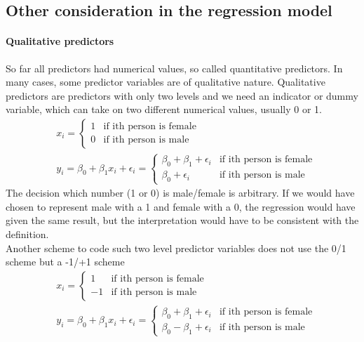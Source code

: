 \documentclass[../document.tex]{subfiles}
\begin{document}
	\subsection{Other consideration in the regression model}

	\paragraph{Qualitative predictors}
	So far all predictors had numerical values, so called quantitative predictors. In many cases, some predictor variables are of qualitative nature. Qualitative predictors are predictors with only two levels and we need an indicator or dummy variable, which can take on two different numerical values, usually 0 or 1.
	\begin{equation}
	\begin{split}
		&x_{i}=\begin{cases}
			1 &\text{if ith person is female}\\
			0 &\text{if ith person is male}
		\end{cases}\\
		&y_{i} = \beta_{0}+\beta_{1}x_{i}+\epsilon_{i}=\begin{cases}
			\beta_{0}+\beta_{1}+\epsilon_{i} &\text{if ith person is female}\\
			\beta_{0}+\epsilon_{i} &\text{if ith person is male}
		\end{cases}
	\end{split}
	\end{equation}
	The decision which number (1 or 0) is male/female is arbitrary. If we would have chosen to represent male with a 1 and female with a 0, the regression would have given the same result, but the interpretation would have to be consistent with the definition.\\
	Another scheme to code such two level predictor variables does not use the 0/1 scheme but a -1/+1 scheme
	\begin{equation}
	\begin{split}
	&x_{i}=\begin{cases}
	1 &\text{if ith person is female}\\
	-1 &\text{if ith person is male}
	\end{cases}\\
	&y_{i} = \beta_{0}+\beta_{1}x_{i}+\epsilon_{i}=\begin{cases}
	\beta_{0}+\beta_{1}+\epsilon_{i} &\text{if ith person is female}\\
	\beta_{0}-\beta_{1}+\epsilon_{i} &\text{if ith person is male}
	\end{cases}
	\end{split}
	\end{equation}
\end{document}
